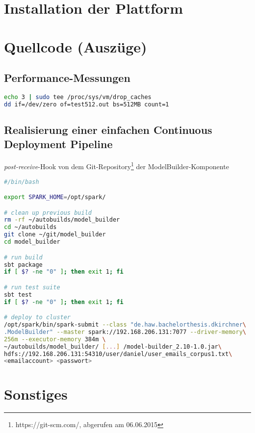 \begin{appendices}
\section{Installation der Plattform}
\section{Quellcode (Auszüge)}
\subsection{Performance-Messungen}

\begin{lstlisting}[language=Bash,caption={Messung der Festplattenperformance - Beispiel: Schreiben eines 512MB Blockes},label={lst:measure_harddrive}]
echo 3 | sudo tee /proc/sys/vm/drop_caches
dd if=/dev/zero of=test512.out bs=512MB count=1
\end{lstlisting}

\subsection{Realisierung einer einfachen Continuous Deployment Pipeline}\label{subsec:pipeline}
\textit{post-receive}-Hook von dem Git-Repository\footnote{https://git-scm.com/, abgerufen am 06.06.2015} der ModelBuilder-Komponente
\begin{lstlisting}[language=Bash,caption={Primitive Continuous Deployment Pipeline. Beispiel: ModelBuilder},label={lst:cdp_modelbuilder}]
#/bin/bash

export SPARK_HOME=/opt/spark/

# clean up previous build
rm -rf ~/autobuilds/model_builder
cd ~/autobuilds
git clone ~/git/model_builder
cd model_builder

# run build
sbt package
if [ $? -ne "0" ]; then exit 1; fi

# run test suite
sbt test
if [ $? -ne "0" ]; then exit 1; fi

# deploy to cluster
/opt/spark/bin/spark-submit --class "de.haw.bachelorthesis.dkirchner\
.ModelBuilder" --master spark://192.168.206.131:7077 --driver-memory\
256m --executor-memory 384m \
~/autobuilds/model_builder/ [...] /model-builder_2.10-1.0.jar\
hdfs://192.168.206.131:54310/user/daniel/user_emails_corpus1.txt\
<emailaccount> <passwort>
\end{lstlisting}

\section{Sonstiges}

\end{appendices}
